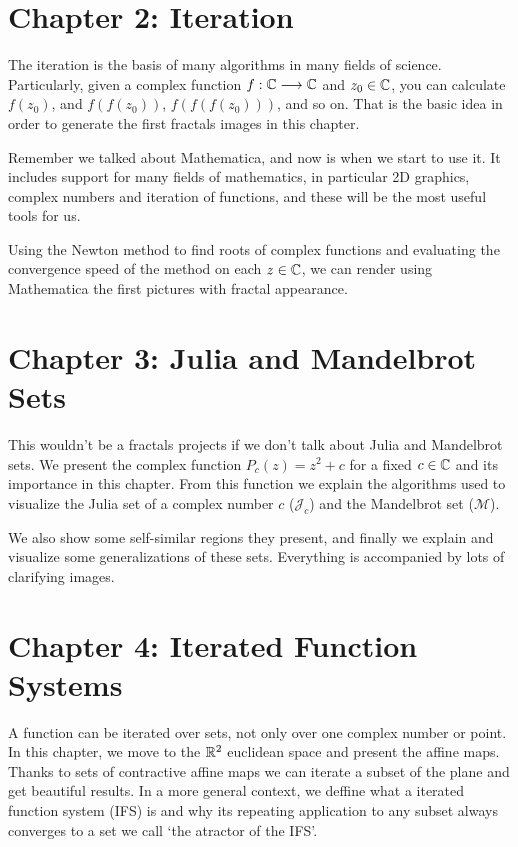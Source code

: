 \section*{Chapter 2: Iteration}

The iteration is the basis of many algorithms in many fields of science. Particularly, given a complex function $f:\mathbb{C}\longrightarrow\mathbb{C}$ and $z_0\in\mathbb{C}$, you can calculate $f(z_0)$, and $f(f(z_0))$, $f(f(f(z_0)))$, and so on. That is the basic idea in order to generate the first fractals images in this chapter.

Remember we talked about Mathematica, and now is when we start to use it. It includes support for many fields of mathematics, in particular 2D graphics, complex numbers and iteration of functions, and these will be the most useful tools for us. 

Using the Newton method to find roots of complex functions and evaluating the convergence speed of the method on each $z\in\mathbb{C}$, we can render using Mathematica the first pictures with fractal appearance.

\section*{Chapter 3: Julia and Mandelbrot Sets}

This wouldn't be a fractals projects if we don't talk about Julia and Mandelbrot sets. We present the complex function $P_c(z)=z^2 +c$ for a fixed $c\in\mathbb{C}$ and its importance in this chapter. From this function we explain the algorithms used to visualize the Julia set of a complex number $c$ ($\mathcal{J}_c$) and the Mandelbrot set ($\mathcal{M}$). 

We also show some self-similar regions they present, and finally we explain and visualize some generalizations of these sets. Everything is accompanied by lots of clarifying images.

\section*{Chapter 4: Iterated Function Systems}

A function can be iterated over sets, not only over one complex number or point. In this chapter, we move to the $\mathbb{R}^2$ euclidean space and present the affine maps. Thanks to sets of contractive affine maps we can iterate a subset of the plane and get beautiful results. In a more general context, we deffine what a iterated function system (IFS) is and why its repeating application to any subset always converges to a set we call `the atractor of the IFS'.

